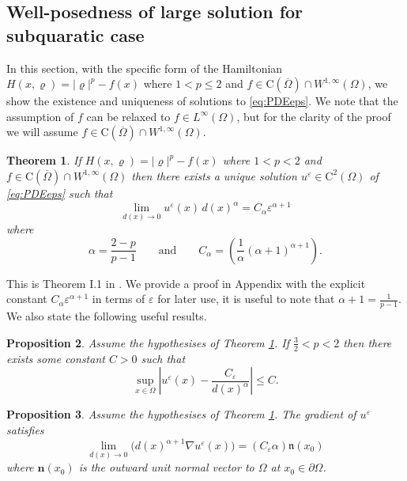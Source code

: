 \documentclass[11pt,reqno]{amsart}
\numberwithin{figure}{section}
\theoremstyle{plain}
\newtheorem{thm}{Theorem}[section]
\newtheorem{prop}[thm]{Proposition}
\theoremstyle{remark}
\numberwithin{equation}{section}
\begin{document}
\subsection{Well-posedness of large solution for subquaratic case} In this section, with the specific form of the Hamiltonian $H(x,\varrho) = |\varrho|^p - f(x)$ where $1<p\leq 2$ and $f\in \mathrm{C}(\overline{\Omega})\cap W^{1,\infty}(\Omega)$, we show the existence and uniqueness of solutions to \eqref{eq:PDEeps}. 
We note that the assumption of $f$ can be relaxed to $f\in L^\infty(\Omega)$, but for the clarity of the proof we will assume $f\in \mathrm{C}(\overline{\Omega})\cap W^{1,\infty}(\Omega)$.

\begin{thm}\label{thm:wellposed1<p<2} If $H(x,\varrho) = |\varrho|^p - f(x)$ where $1<p< 2$ and $f\in \mathrm{C}(\overline{\Omega})\cap W^{1,\infty}(\Omega)$ then there exists a unique solution $u^\varepsilon\in \mathrm{C}^2(\Omega)$ of \eqref{eq:PDEeps} such that
\begin{equation*}
    \lim_{d(x)\to 0} u^\varepsilon(x) \,d(x)^\alpha = C_\alpha \varepsilon^{\alpha+1}
\end{equation*}
where
\begin{equation*}
    \displaystyle\alpha = \frac{2-p}{p-1} \qquad\text{and}\qquad C_\alpha = \left(\frac{1}{\alpha}(\alpha+1)^{\alpha+1}\right).
\end{equation*}
\end{thm}
\noindent This is Theorem I.1 in \cite{Lasry1989}. We provide a proof in Appendix with the explicit constant $C_\alpha\varepsilon^{\alpha+1}$ in terms of $\varepsilon$ for later use, it is useful to note that $\alpha+1 = \frac{1}{p-1}$. We also state the following useful results.

\begin{prop}\cite{Lasry1989}\label{prop:u<} Assume the hypothesises of Theorem \ref{thm:wellposed1<p<2}. If $\frac{3}{2}<p<2$ then there exists some constant $C>0$ such that
\begin{equation*}
  \sup_{x\in \Omega} \left|u^\varepsilon(x) - \frac{C_\varepsilon}{d(x)^\alpha}\right| \leq C.
\end{equation*}
\end{prop} 

\begin{prop}\cite[Theorem B.3]{alessio_asymptotic_2006}\label{prop:grad} Assume the hypothesises of Theorem \ref{thm:wellposed1<p<2}. The gradient of $u^\varepsilon$ satisfies
\begin{equation*}
    \lim_{d(x)\to 0} \Big( d(x)^{\alpha+1}\nabla u^\varepsilon(x)\Big) = \left(C_\varepsilon \alpha\right) \mathfrak{n}(x_0)
\end{equation*}
where $\mathbf{n}(x_0)$ is the outward unit normal vector to $\Omega$ at $x_0\in \partial\Omega$.
\end{prop} 
\end{document}
